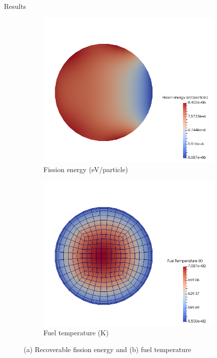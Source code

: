 \documentclass[10pt]{beamer}
\begin{document}
\begin{frame}{Results}
\begin{figure}[!htb]
\centering
\begin{subfigure}{.5\textwidth}
  \centering
  \includegraphics[width=0.9\linewidth]{../Figures/kappa_fission.png}
  \caption{Fission energy (eV/particle)}
\end{subfigure}%
\begin{subfigure}{.5\textwidth}
  \centering
  \includegraphics[width=0.9\linewidth]{../Figures/fuel_temp.png}
  \caption{Fuel temperature (K)}
\end{subfigure}
\caption{(a) Recoverable fission energy and (b)
fuel temperature}
\label{fig:openmc_buffalo}
\end{figure}
\end{frame}
\end{document}

